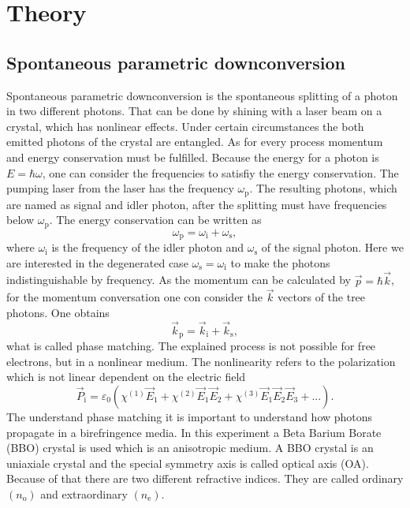 \section{Theory}\label{sec:theory}
\subsection{Spontaneous parametric downconversion}\label{sec:SPD}
Spontaneous parametric downconversion is the spontaneous splitting of a photon in two different photons. That can be done by shining with a laser beam on a crystal, which has nonlinear effects. Under certain circumstances the both emitted photons of the crystal are entangled. 
As for every process momentum and energy conservation must be fulfilled. Because the energy for a photon is $E = \hbar \omega$, one can consider the frequencies to satisfiy the energy conservation. The pumping laser from the laser has the frequency $\omega_{\mathrm{p}}$. The resulting photons, which are named as signal and idler photon, after the splitting must have frequencies below $\omega_{\mathrm{p}}$. The energy conservation can be written as
\begin{equation}
    \omega_{\mathrm{p}} = \omega_{\mathrm{i}} + \omega_{\mathrm{s}},
\end{equation}
where $\omega_{\mathrm{i}}$ is the frequency of the idler photon and $\omega_{\mathrm{s}}$ of the signal photon. Here we are interested in the degenerated case $ \omega_{\mathrm{s}} = \omega_{\mathrm{i}}$ to make the photons indistinguishable by frequency. 
As the momentum can be calculated by $\vec{p} = \hbar \vec{k}$, for  the momentum conversation one con consider the $\vec{k}$ vectors of the tree photons. One obtains
\begin{equation}
    \vec{k}_{\mathrm{p}} =  \vec{k}_{\mathrm{i}}  + \vec{k}_{\mathrm{s}},
    \label{eq:phase_matching}
\end{equation}
what is called phase matching. 
The explained process is not possible for free electrons, but in a nonlinear medium. The nonlinearity refers to the polarization which is not linear dependent on the electric field
\begin{equation}
    \vec{P}_{\mathrm{i}} = \varepsilon_0 \left( 
      \chi^{(1)} \vec{E}_1 
    + \chi^{(2)} \vec{E}_1 \vec{E}_2 
    + \chi^{(3)} \vec{E}_1 \vec{E}_2 \vec{E}_3 + ... 
    \right).
\end{equation}
The understand phase matching it is important to understand how photons propagate in a birefringence media. In this experiment a Beta Barium Borate (BBO) crystal is used which is an anisotropic medium. A BBO crystal is an uniaxiale crystal and the special symmetry axis is called optical axis (OA).  Because of that there are two different refractive indices. They are called ordinary $(n_{\mathrm{o}})$ and extraordinary $(n_{\mathrm{e}})$. 
